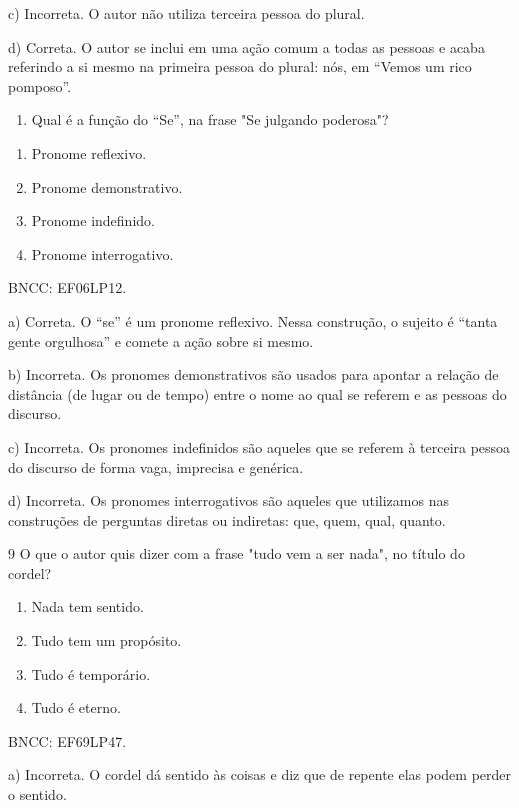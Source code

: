{c) Incorreta. O autor não utiliza terceira pessoa do plural.

d) Correta. O autor se inclui em uma ação comum a todas as pessoas e
acaba referindo a si mesmo na primeira pessoa do plural: nós, em ``Vemos
um rico pomposo''.

\begin{enumerate}
\def\labelenumi{\arabic{enumi}.}
\setcounter{enumi}{7}
\tightlist
\item
  Qual é a função do ``Se'', na frase "Se julgando poderosa"?
\end{enumerate}

\begin{enumerate}
\def\labelenumi{\alph{enumi})}
\item
  Pronome reflexivo.
\item
  Pronome demonstrativo.
\item
  Pronome indefinido.
\item
  Pronome interrogativo.
\end{enumerate}

BNCC: EF06LP12.

a) Correta. O ``se'' é um pronome reflexivo. Nessa construção, o sujeito
é ``tanta gente orgulhosa'' e comete a ação sobre si mesmo.

b) Incorreta. Os pronomes demonstrativos são usados para apontar a
relação de distância (de lugar ou de tempo) entre o nome ao qual se
referem e as pessoas do discurso.

c) Incorreta. Os pronomes indefinidos são aqueles que se referem à
terceira pessoa do discurso de forma vaga, imprecisa e genérica.

d) Incorreta. Os pronomes interrogativos são aqueles que utilizamos nas
construções de perguntas diretas ou indiretas: que, quem, qual, quanto.

\num{9} O que o autor quis dizer com a frase "tudo vem a ser nada", no
título do cordel?

\begin{enumerate}
\def\labelenumi{\alph{enumi})}
\item
  Nada tem sentido.
\item
  Tudo tem um propósito.
\item
  Tudo é temporário.
\item
  Tudo é eterno.
\end{enumerate}

BNCC: EF69LP47.

a) Incorreta. O cordel dá sentido às coisas e diz que de repente elas
podem perder o sentido.

}
